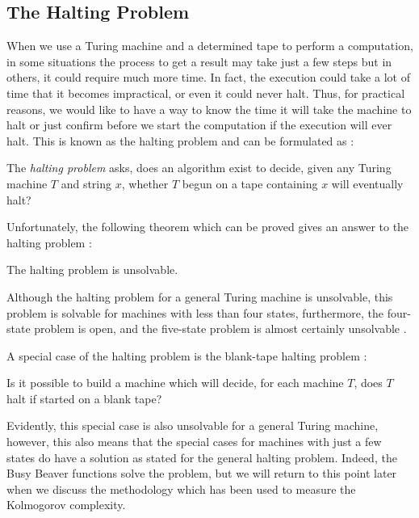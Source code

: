 \subsection{The Halting Problem}
\label{halting_problem}
When we use a Turing machine and a determined tape to perform a computation, in some situations the process to get a result may take just a few steps but in others, it could require much more time. In fact, the execution could take a lot of time that it becomes impractical, or even it could never halt. Thus, for practical reasons, we would like to have a way to know the time it will take the machine to halt or just confirm before we start the computation if the execution will ever halt. This is known as the halting problem and can be formulated as \cite{judith}:

\begin{defn}
The \textit{halting problem} asks, does an algorithm exist to decide, given any Turing machine $T$ and string $x$, whether $T$ begun on a tape containing $x$ will eventually halt?
\end{defn}

Unfortunately, the following theorem which can be proved gives an answer to the halting problem \cite{judith} \cite{marvin}:

\begin{theorem}
The halting problem is unsolvable.
\end{theorem}

Although the halting problem for a general Turing machine is unsolvable, this problem is solvable for machines with less than four states, furthermore, the four-state problem is open, and the five-state problem is almost certainly unsolvable \cite{halting}.

A special case of the halting problem is the blank-tape halting problem \cite{marvin}:

\begin{defn}
Is it possible to build a machine which will decide, for each machine $T$, does $T$ halt if started on a blank tape?
\end{defn}

Evidently, this special case is also unsolvable for a general Turing machine, however, this also means that the special cases for machines with just a few states do have a solution as stated for the general halting problem. Indeed, the Busy Beaver functions solve the problem, but we will return to this point later when we discuss the methodology which has been used to measure the Kolmogorov complexity.

